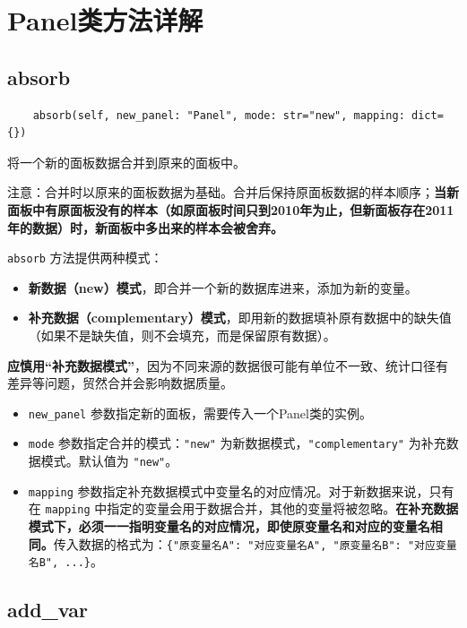 \documentclass[a4paper, UTF8, fontset=none]{ctexart}
\begin{document}
\section{Panel类方法详解}

\subsection{absorb}

    \begin{lstlisting}
    absorb(self, new_panel: "Panel", mode: str="new", mapping: dict={})
    \end{lstlisting}    

    将一个新的面板数据合并到原来的面板中。

    注意：合并时以原来的面板数据为基础。合并后保持原面板数据的样本顺序；\textbf{当新面板中有原面板没有的样本（如原面板时间只到2010年为止，但新面板存在2011年的数据）时，新面板中多出来的样本会被舍弃。}

    \verb|absorb| 方法提供两种模式：

    \begin{itemize}
        \item \textbf{新数据（new）模式}，即合并一个新的数据库进来，添加为新的变量。
        \item \textbf{补充数据（complementary）模式}，即用新的数据填补原有数据中的缺失值（如果不是缺失值，则不会填充，而是保留原有数据）。
    \end{itemize}

    \textbf{应慎用“补充数据模式”}，因为不同来源的数据很可能有单位不一致、统计口径有差异等问题，贸然合并会影响数据质量。

    \begin{itemize}
        \item \verb|new_panel| 参数指定新的面板，需要传入一个Panel类的实例。
        \item \verb|mode| 参数指定合并的模式：\verb|"new"| 为新数据模式，\verb|"complementary"| 为补充数据模式。默认值为 \verb|"new"|。
        \item \verb|mapping| 参数指定补充数据模式中变量名的对应情况。对于新数据来说，只有在 \verb|mapping| 中指定的变量会用于数据合并，其他的变量将被忽略。\textbf{在补充数据模式下，必须一一指明变量名的对应情况，即使原变量名和对应的变量名相同。}传入数据的格式为：\verb|{"原变量名A": "对应变量名A", "原变量名B": "对应变量名B", ...}|。
    \end{itemize}

\subsection{add\_var}
\end{document}
